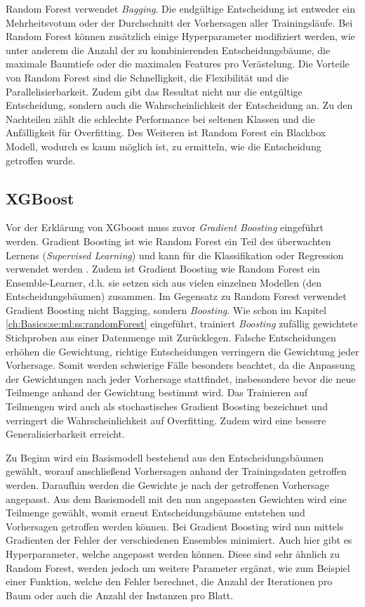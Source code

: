 Random Forest verwendet \textit{Bagging}. 
Die endgültige Entscheidung ist entweder ein Mehrheitsvotum oder der Durchschnitt der Vorhersagen aller Trainingsläufe.
Bei Random Forest können zusätzlich einige Hyperparameter modifiziert werden, wie unter anderem die Anzahl der zu kombinierenden Entscheidungsbäume, die maximale Baumtiefe oder die maximalen Features pro Verästelung. 
Die Vorteile von Random Forest sind die Schnelligkeit, die Flexibilität und die Parallelisierbarkeit.
Zudem gibt das Resultat nicht nur die entgültige Entscheidung, sondern auch die Wahrscheinlichkeit der Entscheidung an.
Zu den Nachteilen zählt die schlechte Performance bei seltenen Klassen und die Anfälligkeit für Overfitting.
Des Weiteren ist Random Forest ein Blackbox Modell, wodurch es kaum möglich ist, zu ermitteln, wie die Entscheidung getroffen wurde.

\subsection{XGBoost}
\label{ch:Basics:se:ml:ss:xgboost}
Vor der Erklärung von XGboost muss zuvor \textit{Gradient Boosting} eingeführt werden.
Gradient Boosting ist wie Random Forest ein Teil des überwachten Lernens (\textit{Supervised Learning}) und kann für die Klassifikation oder Regression verwendet werden \cite{friedmannStochasticGradientBoosting1999}. 
Zudem ist Gradient Boosting wie Random Forest ein Ensemble-Learner, d.h. sie setzen sich aus vielen einzelnen Modellen (den Entscheidungsbäumen) zusammen.
Im Gegensatz zu Random Forest verwendet Gradient Boosting nicht Bagging, sondern \textit{Boosting}.
Wie schon im Kapitel \ref{ch:Basics:se:ml:ss:randomForest} eingeführt, trainiert \textit{Boosting} zufällig gewichtete Stichproben aus einer Datenmenge mit Zurücklegen. 
Falsche Entscheidungen erhöhen die Gewichtung, richtige Entscheidungen verringern die Gewichtung jeder Vorhersage. 
Somit werden schwierige Fälle besonders beachtet, da die Anpassung der Gewichtungen nach jeder Vorhersage stattfindet, insbesondere bevor die neue Teilmenge anhand der Gewichtung bestimmt wird.
Das Trainieren auf Teilmengen wird auch als stochastisches Gradient Boosting bezeichnet und verringert die Wahrscheinlichkeit auf Overfitting.
Zudem wird eine bessere Generalisierbarkeit erreicht.

Zu Beginn wird ein Basismodell bestehend aus den Entscheidungsbäumen gewählt, worauf anschließend Vorhersagen anhand der Trainingsdaten getroffen werden. 
Daraufhin werden die Gewichte je nach der getroffenen Vorhersage angepasst. 
Aus dem Basismodell mit den nun angepassten Gewichten wird eine Teilmenge gewählt, womit erneut Entscheidungsbäume entstehen und Vorhersagen getroffen werden können.
Bei Gradient Boosting wird nun mittels Gradienten der Fehler der verschiedenen Ensembles minimiert.
Auch hier gibt es Hyperparameter, welche angepasst werden können. 
Diese sind sehr ähnlich zu Random Forest, werden jedoch um weitere Parameter ergänzt, wie zum Beispiel einer Funktion, welche den Fehler berechnet, die Anzahl der Iterationen pro Baum oder auch die Anzahl der Instanzen pro Blatt.

